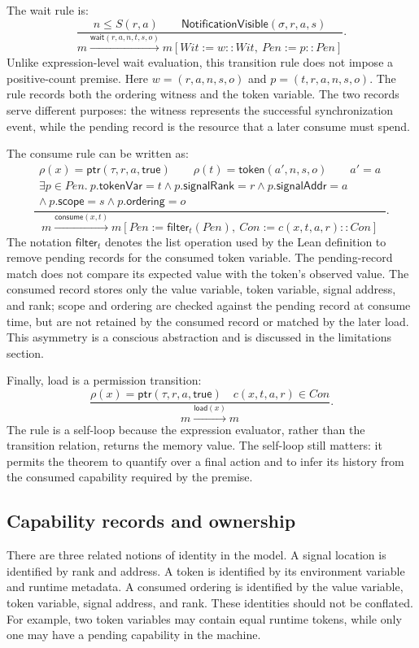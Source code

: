 \documentclass[a4paper,USenglish]{lipics-v2021}
\begin{document}
The wait rule is:
\[
\frac{n\leq S(r,a) \qquad
  \mathsf{NotificationVisible}(\sigma,r,a,s)}
     {m\xrightarrow{\mathsf{wait}(r,a,n,t,s,o)}
  m[Wit:=w::Wit,\ Pen:=p::Pen]}.
\]
Unlike expression-level wait evaluation, this transition rule does not impose
a positive-count premise.
Here \(w=(r,a,n,s,o)\) and \(p=(t,r,a,n,s,o)\). The rule records both the
ordering witness and the token variable. The two records serve different
purposes: the witness represents the successful synchronization event, while
the pending record is the resource that a later consume must spend.

The consume rule can be written as:
\[
\frac{\begin{gathered}
  \rho(x)=\mathsf{ptr}(\tau,r,a,\mathsf{true}) \qquad
  \rho(t)=\mathsf{token}(a',n,s,o) \qquad a'=a \\
  \exists p\in Pen.\ p.\mathsf{tokenVar}=t\land
  p.\mathsf{signalRank}=r\land p.\mathsf{signalAddr}=a \\
  \land\ p.\mathsf{scope}=s\land p.\mathsf{ordering}=o
\end{gathered}}{m\xrightarrow{\mathsf{consume}(x,t)}
  m[Pen:=\mathsf{filter}_{t}(Pen),\ Con:=c(x,t,a,r)::Con]}.
\]
The notation \(\mathsf{filter}_{t}\) denotes the list operation used by the
Lean definition to remove pending records for the consumed token variable.
The pending-record match does not compare its expected value with the token's
observed value. The consumed record stores only the value variable, token
variable, signal address, and rank; scope and ordering are checked against the
pending record at consume time, but are not retained by the consumed record or
matched by the later load. This asymmetry is a conscious abstraction and is
discussed in the limitations section.

Finally, load is a permission transition:
\[
\frac{\rho(x)=\mathsf{ptr}(\tau,r,a,\mathsf{true}) \quad
  c(x,t,a,r)\in Con}
     {m\xrightarrow{\mathsf{load}(x)}m}.
\]
The rule is a self-loop because the expression evaluator, rather than the
transition relation, returns the memory value. The self-loop still matters:
it permits the theorem to quantify over a final action and to infer its
history from the consumed capability required by the premise.

\subsection{Capability records and ownership}
There are three related notions of identity in the model. A signal location is
identified by rank and address. A token is identified by its environment
variable and runtime metadata. A consumed ordering is identified by the value
variable, token variable, signal address, and rank. These identities should not
be conflated. For example, two token variables may contain equal runtime
tokens, while only one may have a pending capability in the machine.
\end{document}
